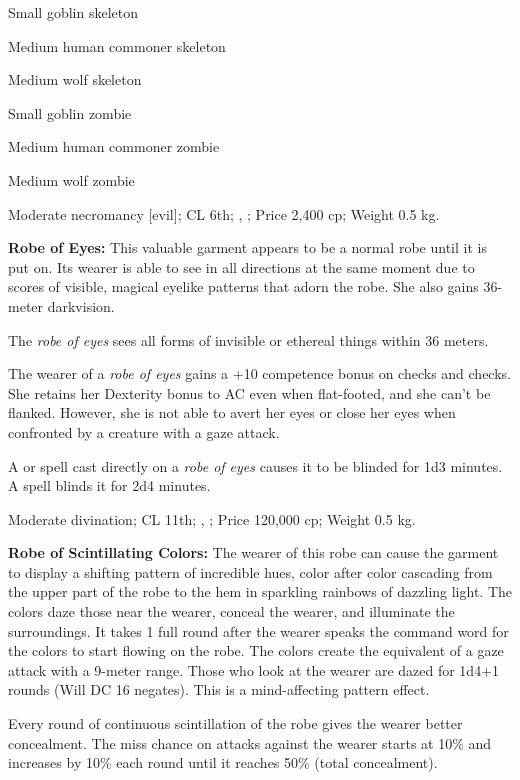 \begin{itemize*}
\item Small goblin skeleton
\item Medium human commoner skeleton
\item Medium wolf skeleton
\item Small goblin zombie
\item Medium human commoner zombie
\item Medium wolf zombie
\end{itemize*}

Moderate necromancy [evil]; CL 6th; , ; Price 2,400 cp; Weight 0.5 kg.

\textbf{Robe of Eyes:} This valuable garment appears to be a normal robe until it is put on. Its wearer is able to see in all directions at the same moment due to scores of visible, magical eyelike patterns that adorn the robe. She also gains 36-meter darkvision.

The \emph{robe of eyes} sees all forms of invisible or ethereal things within 36 meters.

The wearer of a \emph{robe of eyes} gains a +10 competence bonus on  checks and  checks. She retains her Dexterity bonus to AC even when flat-footed, and she can't be flanked. However, she is not able to avert her eyes or close her eyes when confronted by a creature with a gaze attack.

A  or  spell cast directly on a \emph{robe of eyes} causes it to be blinded for 1d3 minutes. A  spell blinds it for 2d4 minutes.

Moderate divination; CL 11th; , ; Price 120,000 cp; Weight 0.5 kg.

\textbf{Robe of Scintillating Colors:} The wearer of this robe can cause the garment to display a shifting pattern of incredible hues, color after color cascading from the upper part of the robe to the hem in sparkling rainbows of dazzling light. The colors daze those near the wearer, conceal the wearer, and illuminate the surroundings. It takes 1 full round after the wearer speaks the command word for the colors to start flowing on the robe. The colors create the equivalent of a gaze attack with a 9-meter range. Those who look at the wearer are dazed for 1d4+1 rounds (Will DC 16 negates). This is a mind-affecting pattern effect.

Every round of continuous scintillation of the robe gives the wearer better concealment. The miss chance on attacks against the wearer starts at 10\% and increases by 10\% each round until it reaches 50\% (total concealment).

